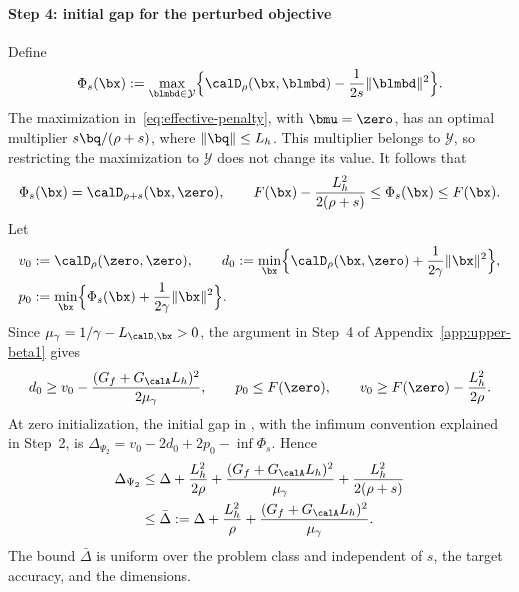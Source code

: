 \paragraph{Step 4: initial gap for the perturbed objective}
Define
\[
\Phi_s(\bx):=\max_{\blmbd\in\mathcal Y}
\Bigl\{\calD_\rho(\bx,\blmbd)-\frac1{2s}\|\blmbd\|^2\Bigr\}.
\]
The maximization in~\eqref{eq:effective-penalty}, with \(\bmu=\zero\),
has an optimal multiplier \(s\bq/(\rho+s)\), where
\(\|\bq\|\le L_h\). This multiplier belongs to \(\mathcal Y\), so
restricting the maximization to \(\mathcal Y\) does not change its value.
It follows that
\begin{equation}
\Phi_s(\bx)=\calD_{\rho+s}(\bx,\zero),\qquad
F(\bx)-\frac{L_h^2}{2(\rho+s)}\le\Phi_s(\bx)\le F(\bx).
\label{eq:beta0-perturbed-objective}
\end{equation}
Let
\[
\begin{aligned}
v_0&:=\calD_\rho(\zero,\zero),\qquad
 d_0:=\min_{\bx}\Bigl\{\calD_\rho(\bx,\zero)
                         +\frac1{2\gamma}\|\bx\|^2\Bigr\},\\
p_0&:=\min_{\bx}\Bigl\{\Phi_s(\bx)+\frac1{2\gamma}\|\bx\|^2\Bigr\}.
\end{aligned}
\]
Since \(\mu_\gamma=1/\gamma-L_{\calD,\bx}>0\), the argument in
Step~4 of Appendix~\ref{app:upper-beta1} gives
\[
d_0\ge v_0-\frac{(G_f+G_{\calA}L_h)^2}{2\mu_\gamma},\qquad
p_0\le F(\zero),\qquad v_0\ge F(\zero)-\frac{L_h^2}{2\rho}.
\]
At zero initialization, the initial gap in
\cite[Definition~3.1(ii)]{li2026smoothing}, with the infimum convention
explained in Step~2, is
\(\Delta_{\Psi_2}=v_0-2d_0+2p_0-\inf\Phi_s\). Hence
\begin{equation}
\begin{aligned}
\Delta_{\Psi_2}
&\le\Delta+\frac{L_h^2}{2\rho}
+\frac{(G_f+G_{\calA}L_h)^2}{\mu_\gamma}
+\frac{L_h^2}{2(\rho+s)}\\
&\le\bar\Delta:=\Delta+\frac{L_h^2}{\rho}
+\frac{(G_f+G_{\calA}L_h)^2}{\mu_\gamma}.
\end{aligned}
\label{eq:beta0-initial-gap}
\end{equation}
The bound \(\bar\Delta\) is uniform over the problem class and independent
of \(s\), the target accuracy, and the dimensions.

